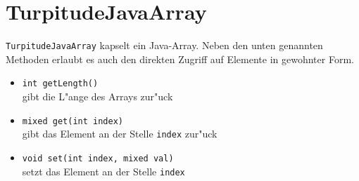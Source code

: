 
\section{TurpitudeJavaArray}

\texttt{TurpitudeJavaArray} kapselt ein Java-Array. Neben den unten
genannten Methoden erlaubt es auch den direkten Zugriff auf Elemente
in gewohnter Form.

\begin{itemize}
\item
\texttt{int getLength()}\\
gibt die L"ange des Arrays zur"uck
\item
\texttt{mixed get(int index)}\\
gibt das Element an der Stelle \texttt{index} zur"uck
\item
\texttt{void set(int index, mixed val)}\\
setzt das Element an der Stelle \texttt{index}
\end{itemize}
